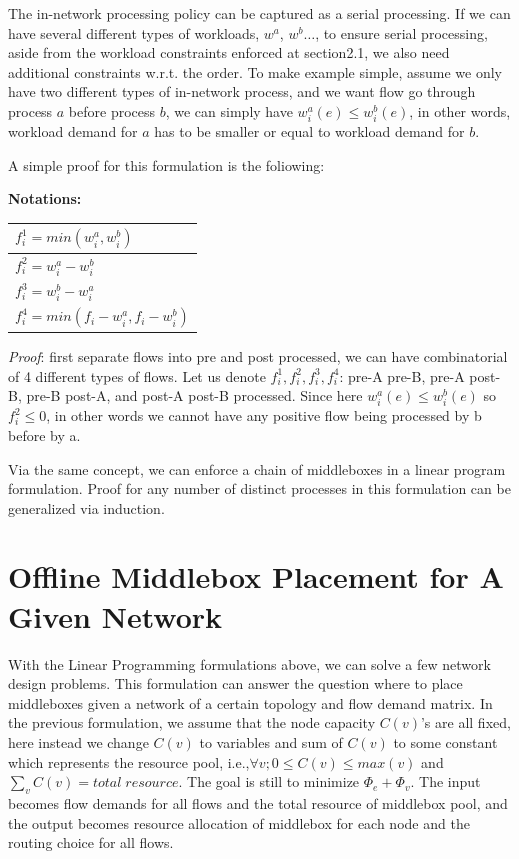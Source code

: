 \documentclass[twocolumn]{article}
\begin{document}
The in-network processing policy can be captured as a serial processing. If we can have several different types of workloads, $w^a$, $w^b\dots$, to ensure serial processing, aside from the workload constraints enforced at section2.1, we also need additional constraints w.r.t. the order. To make example simple, assume we only have two different types of in-network process, and we want flow go through process $a$ before process $b$, we can simply have $w^a_i(e) \leq w_i^b(e)$, in other words, workload demand for $a$ has to be smaller or equal to workload demand for $b$. 

A simple proof for this formulation is the foliowing:

\textbf{Notations:}

\begin{tabular} {|l |}
\hline
$ f_i^1=min (w_i^a, w_i^b)$\\ \hline
$ f_i^2 = w_i^a - w_i^b$ \\\hline
$ f_i^3 =w_i^b - w_i^a $ \\ \hline
$ f_i^4 = min (f_i -w_i^a ,f_i - w_i^b) $ \\ \hline
\end{tabular}
\newline
\textit{Proof}: first separate flows into pre and post processed, we can have combinatorial of 4 different types of flows. Let us denote $f_i^1, f_i^2, f_i^3, f_i^4$: pre-A pre-B, pre-A post-B, pre-B post-A, and post-A post-B processed. Since here  $w_i^a(e) \leq w_i^b(e)$ so $f_i^2\leq 0$, in other words we cannot have any positive flow being processed by b before by a.
 
Via the same concept, we can enforce a chain of middleboxes in a linear program formulation. Proof for any number of distinct processes in this formulation can be generalized via induction.


\section{Offline Middlebox Placement for A Given Network} \label{placement}
With the Linear Programming formulations above, we can solve a few network design problems. This formulation can answer the question where to place middleboxes given a network of a certain topology and flow demand matrix. In the previous formulation, we assume that the node capacity $C(v)$'s are all fixed, here instead we change $C(v)$ to variables and sum of $C(v)$ to some constant which represents the resource pool, i.e.,$\forall v; 0 \leq C(v) \leq max(v) $ and $\sum\limits_v C(v) = total\;resource$. The goal is still to minimize $\Phi_e + \Phi_v$. The input becomes flow demands for all flows and the total resource of middlebox pool, and the output becomes resource allocation of middlebox for each node and the routing choice for all flows. 
\end{document}
